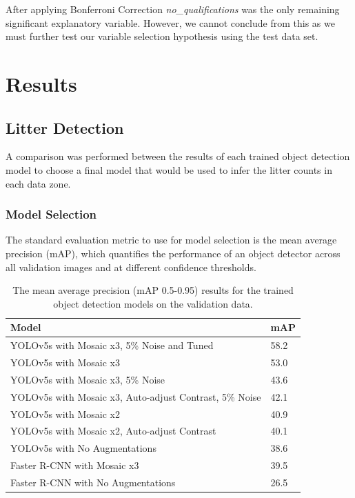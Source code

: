 \documentclass{thesis}
\begin{document}
After applying Bonferroni Correction \textit{no\_qualifications} was the only remaining significant explanatory variable. However, we cannot conclude from this as we must further test our variable selection hypothesis using the test data set.


\chapter{Results} \label{chapter:results}

\section{Litter Detection}

A comparison was performed between the results of each trained object detection model to choose a final model that would be used to infer the litter counts in each data zone.

\subsection{Model Selection}

The standard evaluation metric to use for model selection is the mean average precision (mAP), which quantifies the performance of an object detector across all validation images and at different confidence thresholds.

\begin{table}[ht!]
    \centering
    \begin{tabular}{|l| |l|} 
     \hline
     \textbf{Model} & \textbf{mAP} \\
     \hline\hline
     YOLOv5s with Mosaic x3, 5\% Noise and Tuned & 58.2 \\
     YOLOv5s with Mosaic x3 & 53.0 \\
     YOLOv5s with Mosaic x3, 5\% Noise & 43.6 \\
     YOLOv5s with Mosaic x3, Auto-adjust Contrast, 5\% Noise & 42.1 \\
     YOLOv5s with Mosaic x2 & 40.9  \\
     YOLOv5s with Mosaic x2, Auto-adjust Contrast & 40.1  \\
     YOLOv5s with No Augmentations & 38.6 \\
     Faster R-CNN with Mosaic x3 & 39.5 \\
     Faster R-CNN with No Augmentations & 26.5 \\
     \hline
    \end{tabular}
    \vspace{2mm}
    \caption{The mean average precision (mAP 0.5-0.95) results for the trained object detection models on the validation data.}
    \label{table:model-mAP}
\end{table}
\end{document}
